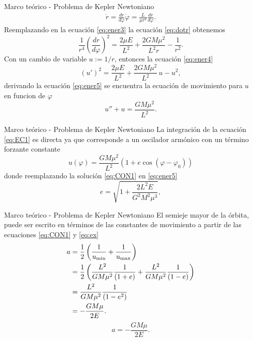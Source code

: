 \begin{frame}{Marco teórico - Problema de Kepler Newtoniano}
\begin{eqnarray}
    \dot{r}=\frac{dr}{d\varphi}\dot{\varphi}=\frac{L}{\mu r^2}\frac{dr}{d\varphi}.
    \label{eq:dotr}
\end{eqnarray}
Reemplazando en la ecuación \ref{eq:ener3} la ecuación \ref{eq:dotr} obtenemos
\begin{equation}
    \frac{1}{r^4}\left(\frac{dr}{d\varphi}\right)^2=\frac{2\mu E}{L^2}+\frac{2GM\mu^2}{L^2r}-\frac{1}{r^2}.\label{eq:ener4}
\end{equation}
Con un cambio de variable $u:=1/r$, entonces la ecuación \ref{eq:ener4}
\begin{equation}
    (u')^2=\frac{2\mu E}{L^2}+\frac{2GM\mu^2}{L^2}\,u-u^{2
    },\label{eq:ener5}
    \end{equation}
derivando la ecuación \ref{eq:ener5} se encuentra la ecuación de movimiento para $u$ en funcion de $\varphi$
\begin{equation}
    u''+u=\frac{GM\mu^2}{L^2}.\label{eq:EC1}
\end{equation}
\end{frame}
\begin{frame}{Marco teórico - Problema de Kepler Newtoniano}
    La integración de la ecuación \ref{eq:EC1} es directa ya que corresponde a un oscilador armónico con un término forzante constante
\begin{equation}
    u(\varphi)=\frac{GM\mu^2}{L^2}\left(1+e\cos
    (\varphi-\varphi_0)\right)\label{eq:CON1}
\end{equation}
donde reemplazando la solución \ref{eq:CON1} en \ref{eq:ener5}
\begin{equation}
    e=\sqrt{1+\frac{2L^2E}{G^2M^2\mu^3}}, \label{eq:ex}
\end{equation}
\end{frame}
\begin{frame}{Marco teórico - Problema de Kepler Newtoniano}
    \vspace{0.3cm}
El semieje mayor de la órbita, puede ser escrito en términos de las constantes de movimiento a partir de las ecuaciones \ref{eq:CON1} y \ref{eq:ex}
\begin{align*}
    a & = \frac{1}{2}\left(\frac{1}{u_{\rm min}}+\frac{1}{u_{\rm max}}\right) \\
    & = \frac{1}{2}\left(\frac{L^2}{GM\mu^2}\frac{1}{(1+e)}+\frac{L^2}{GM\mu^2}\frac{1}{(1-e)}\right) \\
    & = \frac{L^2}{GM\mu^2}\frac{1}{(1-e^2)} \\
    & = -\frac{GM\mu}{2E}.
    \end{align*}
    \begin{equation}
        a= -\frac{GM\mu}{2E}. \label{eq:aE}
    \end{equation}
\end{frame}
